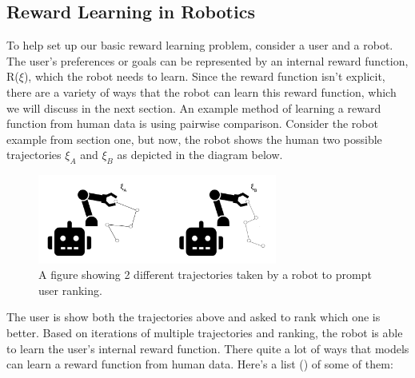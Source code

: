 \documentclass[
  letterpaper,
  DIV=11,
  numbers=noendperiod,
  oneside]{scrreprt}
\theoremstyle{remark}
\begin{document}
\subsection{Reward Learning in
Robotics}\label{reward-learning-in-robotics}

To help set up our basic reward learning problem, consider a user and a
robot. The user's preferences or goals can be represented by an internal
reward function, R(\(\xi\)), which the robot needs to learn. Since the
reward function isn't explicit, there are a variety of ways that the
robot can learn this reward function, which we will discuss in the next
section. An example method of learning a reward function from human data
is using pairwise comparison. Consider the robot example from section
one, but now, the robot shows the human two possible trajectories
\(\xi_A\) and \(\xi_B\) as depicted in the diagram below.

\begin{figure}

{\centering \includegraphics[width=0.7\textwidth,height=\textheight]{src/Figures/robots.png}

}

\caption{A figure showing 2 different trajectories taken by a robot to
prompt user ranking.}

\end{figure}%

The user is show both the trajectories above and asked to rank which one
is better. Based on iterations of multiple trajectories and ranking, the
robot is able to learn the user's internal reward function. There quite
a lot of ways that models can learn a reward function from human data.
Here's a list () of some
of them:
\end{document}
